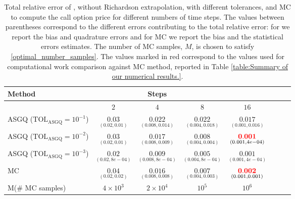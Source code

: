 \begin{table}[h!]
	\centering
	\begin{tabular}{l*{6}{c}r}
	\toprule[1.5pt]
	Method & & Steps  & &     \\
	\hline		
		         & $2$ & $4$ & $8$ & $16$  \\
		\hline
		ASGQ ($\text{TOL}_{\text{ASGQ}}=10^{-1}$)  &  $\underset{(0.02,0.01)}{\mathbf{0.03}}$ & $\underset{(0.008,0.014)}{\mathbf{0.022}}$& $\underset{(0.004,0.018)}{\mathbf{ 0.022}}$ & $\underset{(0.001,0.016)}{\mathbf{ 0.017}}$   \\

		ASGQ ($\text{TOL}_{\text{ASGQ}}=10^{-2}$)  &  $\underset{(0.02,0.01)}{\mathbf{0.03}}$ & $\underset{(0.008,0.009)}{\mathbf{0.017}}$& $\underset{(0.004,0.004)}{\mathbf{ 0.008}}$ & $\underset{(0.001,4e-04)}{\mathbf{ {\color{red}0.001}}}$  \\
		ASGQ ($\text{TOL}_{\text{ASGQ}}=10^{-3}$)  &  $\underset{(0.02,8e-04)}{\mathbf{0.02}}$ & $\underset{(0.008,8e-04)}{\mathbf{0.009}}$& $\underset{(0.004,8e-04)}{\mathbf{0.005}}$  & $\underset{(0.001,4e-04)}{\mathbf{ 0.001}}$  \\
			\hline
				MC    & $\underset{(0.02,0.02)}{\mathbf{0.04}}$  &  $\underset{(0.008,0.008)}{\mathbf{0.016}}$  & $\underset{(0.004,0.003)}{\mathbf{0.007}}$ & $\underset{(0.001,0.001)}{\mathbf{{\color{red}0.002}}}$  \\	
			M(\# MC samples) 	& $4 \times 10^3$  &  $2 \times 10^4$  & $  10^5$ & $10^6$  \\
		\bottomrule[1.25pt]
	\end{tabular}
	\caption{Total relative error of , without Richardson extrapolation,  with different tolerances, and MC to compute the call option price for different numbers of time steps. The values between parentheses correspond to the different errors contributing to the total relative error: for  we report the bias and quadrature errors and for MC we report the bias and the statistical errors estimates. The number of MC samples, $M$, is chosen to satisfy \eqref{optimal_number_samples}. The values marked in red correspond to the values used for computational work comparison against MC method, reported in Table \ref{table:Summary of our numerical results.}.}
	\label{Total error of MISC and MC to compute Call option price of the different tolerances for different number of time steps. Case set 3, without Richardson extrapolation. The numbers between parentheses are the corresponding absolute errors.}
\end{table}


